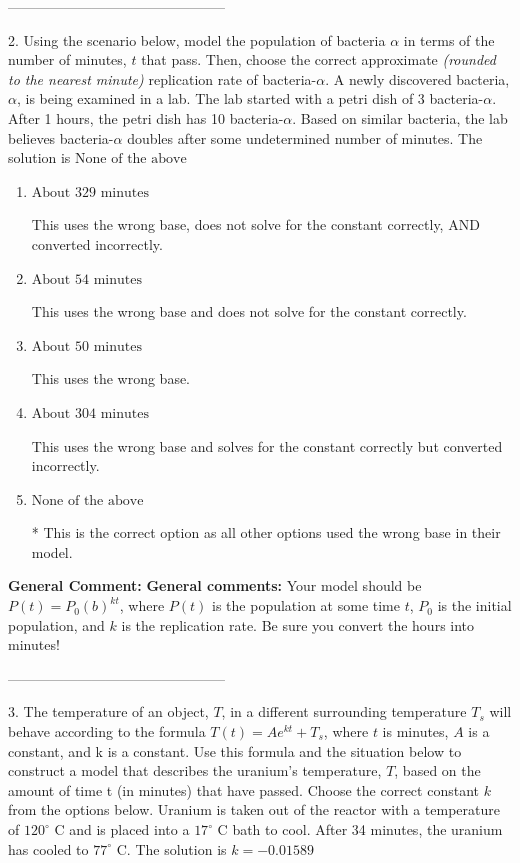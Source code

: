 \documentclass{extbook}[14pt]
\begin{document}
-----------------------------------------------

2. Using the scenario below, model the population of bacteria $\alpha$ in terms of the number of minutes, $t$ that pass. Then, choose the correct approximate \textit{(rounded to the nearest minute)} replication rate of bacteria-$\alpha$.
A newly discovered bacteria, $\alpha$, is being examined in a lab. The lab started with a petri dish of 3 bacteria-$\alpha$. After 1 hours, the petri dish has 10 bacteria-$\alpha$. Based on similar bacteria, the lab believes bacteria-$\alpha$ doubles after some undetermined number of minutes. 
The solution is $ \text{None of the above} $ 

\begin{enumerate}[label=\Alph*.] 
\item $ \text{About } 329 \text{ minutes} $ 

 This uses the wrong base, does not solve for the constant correctly, AND converted incorrectly. 
\item $ \text{About } 54 \text{ minutes} $ 

 This uses the wrong base and does not solve for the constant correctly. 
\item $ \text{About } 50 \text{ minutes} $ 

 This uses the wrong base. 
\item $ \text{About } 304 \text{ minutes} $ 

 This uses the wrong base and solves for the constant correctly but converted incorrectly. 
\item $ \text{None of the above} $ 

 * This is the correct option as all other options used the wrong base in their model. 
\end{enumerate} 
 
\textbf{General Comment:} \textbf{General comments:} Your model should be $P(t) = P_0(b)^{kt}$, where $P(t)$ is the population at some time $t$, $P_0$ is the initial population, and $k$ is the replication rate. Be sure you convert the hours into minutes! 

-----------------------------------------------

3. The temperature of an object, $T$, in a different surrounding temperature $T_s$ will behave according to the formula $T(t) = Ae^{kt} + T_s$, where $t$ is minutes, $A$ is a constant, and k is a constant. Use this formula and the situation below to construct a model that describes the uranium's temperature, $T$, based on the amount of time t (in minutes) that have passed. Choose the correct constant $k$ from the options below.
Uranium is taken out of the reactor with a temperature of $120^{\circ}$ C and is placed into a $17^{\circ}$ C bath to cool. After 34 minutes, the uranium has cooled to $77^{\circ}$ C. 
The solution is $ k = -0.01589 $ 
\end{document}
